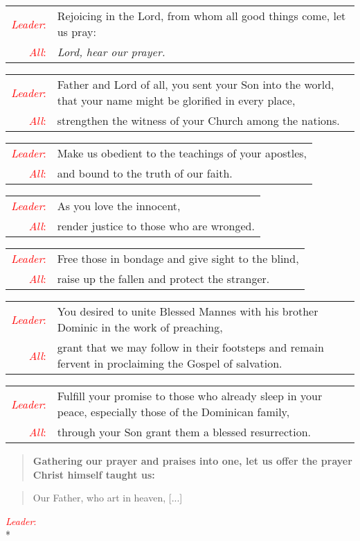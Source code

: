 \documentclass[letterpaper,14pt]{extarticle}
\newcommand{\side}[1]{\flagverse{\textcolor{red}{\textit{#1}}:}}
\newcommand{\sidestar}[1]{\textcolor{red}{\textit{#1}:}}
\newlength{\oldindent}
\newcommand{\antiphon}[2]{
	\setlength{\oldindent}{\vindent}
	\setlength{\vindent}{0em}
	\begin{verse}
	\side{#1} \textbf{#2}
	\end{verse}
	\setlength{\vindent}{\oldindent}
}
\newcommand{\intercession}[2]{
	\begin{tabular}[h]{r p{4.25in}}
		\sidestar{Leader} & #1 \\
		\sidestar{All} & #2
	\end{tabular}}
\begin{document}
\intercession{Rejoicing in the Lord, from whom all good things come, let us pray:}
{\textit{Lord, hear our prayer.}}

\intercession{Father and Lord of all, you sent your Son into the world, that your name might be glorified in every place,}
{strengthen the witness of your Church among the nations.}

\intercession{Make us obedient to the teachings of your apostles,}
{and bound to the truth of our faith.}

\intercession{As you love the innocent,}
{render justice to those who are wronged.}

\intercession{Free those in bondage and give sight to the blind,}
{raise up the fallen and protect the stranger.}


\intercession{You desired to unite Blessed Mannes with his brother Dominic in
the work of preaching,}
{grant that we may follow in their footsteps and remain fervent in proclaiming
the Gospel of salvation.}

\intercession{Fulfill your promise to those who already sleep in your peace, 
especially those of the Dominican family,}
{through your Son grant them a blessed resurrection.}

\antiphon{Leader}{Gathering our prayer and praises into one, let us offer the
prayer Christ himself taught us:}
\begin{verse}
	\side{All} Our Father, who art in heaven, [...] \\
\end{verse}

\sidestar{Leader}\\*
\end{document}
